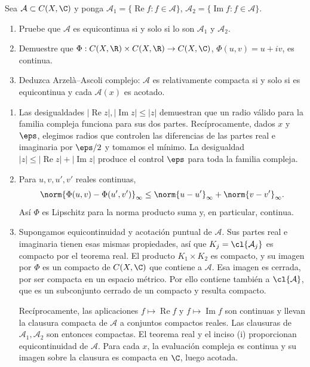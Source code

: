 \begin{ejercicio}\label{ej:lectura-27-5}
Sea $\mathcal A\subset C(X,\C)$ y ponga $\mathcal A_1=\{\operatorname{Re}f:f\in\mathcal A\}$, $\mathcal A_2=\{\operatorname{Im}f:f\in\mathcal A\}$.
\begin{enumerate}[label=(\roman*)]
\item Pruebe que $\mathcal A$ es equicontinua si y solo si lo son $\mathcal A_1$ y $\mathcal A_2$.
\item Demuestre que $\Phi:C(X,\R)\times C(X,\R)\to C(X,\C)$, $\Phi(u,v)=u+iv$, es continua.
\item Deduzca Arzelà--Ascoli complejo: $\mathcal A$ es relativamente compacta si y solo si es equicontinua y cada $\mathcal A(x)$ es acotado.
\end{enumerate}
\end{ejercicio}
\begin{solucion}
\begin{enumerate}[label=(\roman*)]
\item Las desigualdades $|\operatorname{Re}z|,|\operatorname{Im}z|\le|z|$ demuestran que un radio válido para la familia compleja funciona para sus dos partes. Recíprocamente, dados $x$ y $\eps$, elegimos radios que controlen las diferencias de las partes real e imaginaria por $\eps/2$ y tomamos el mínimo. La desigualdad $|z|\le|\operatorname{Re}z|+|\operatorname{Im}z|$ produce el control $\eps$ para toda la familia compleja.
\item Para $u,v,u',v'$ reales continuas,
\[
 \norm{\Phi(u,v)-\Phi(u',v')}_\infty
 \le\norm{u-u'}_\infty+\norm{v-v'}_\infty.
\]
Así $\Phi$ es Lipschitz para la norma producto suma y, en particular, continua.
\item Supongamos equicontinuidad y acotación puntual de $\mathcal A$. Sus partes real e imaginaria tienen esas mismas propiedades, así que $K_j=\cl{\mathcal A_j}$ es compacto por el teorema real. El producto $K_1\times K_2$ es compacto, y su imagen por $\Phi$ es un compacto de $C(X,\C)$ que contiene a $\mathcal A$. Esa imagen es cerrada, por ser compacta en un espacio métrico. Por ello contiene también a $\cl{\mathcal A}$, que es un subconjunto cerrado de un compacto y resulta compacto.

Recíprocamente, las aplicaciones $f\mapsto\operatorname{Re}f$ y $f\mapsto\operatorname{Im}f$ son continuas y llevan la clausura compacta de $\mathcal A$ a conjuntos compactos reales. Las clausuras de $\mathcal A_1,\mathcal A_2$ son entonces compactas. El teorema real y el inciso (i) proporcionan equicontinuidad de $\mathcal A$. Para cada $x$, la evaluación compleja es continua y su imagen sobre la clausura es compacta en $\C$, luego acotada.
\end{enumerate}
\end{solucion}

